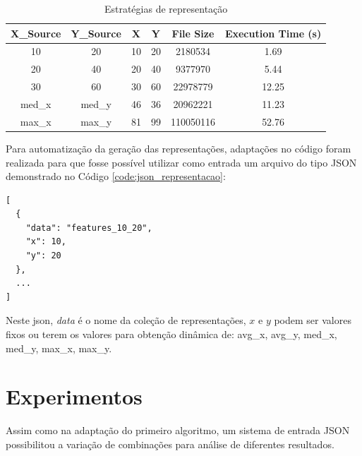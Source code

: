\documentclass[9pt,twocolumn]{article}
\begin{document}
\begin{table}[t]
  \centering
  \begin{tabular}{|c|c|c|c|c|c|}
  \hline
  \textbf{X\_Source} & \textbf{Y\_Source} & \textbf{X} & \textbf{Y} & \textbf{File Size} & \textbf{Execution Time (s)} \\ \hline
  10                 & 20                 & 10         & 20         & 2180534            & 1.69                    \\ \hline
  20                 & 40                 & 20         & 40         & 9377970            & 5.44                    \\ \hline
  30                 & 60                 & 30         & 60         & 22978779           & 12.25                   \\ \hline
  med\_x             & med\_y             & 46         & 36         & 20962221           & 11.23                   \\ \hline
  max\_x             & max\_y             & 81         & 99         & 110050116          & 52.76                   \\ \hline
  \end{tabular}
  \caption{Estratégias de representação}
  \label{tab:estrategias_representacao}
\end{table}

Para automatização da geração das representações, adaptações no código foram realizada para que fosse possível utilizar como entrada um arquivo do tipo JSON demonstrado no Código \ref{code:json_representacao}:

\begin{lstlisting}[caption={JSON para representações},captionpos=b,frame=single,label={code:json_representacao}]
[
  {
    "data": "features_10_20",
    "x": 10,
    "y": 20
  },
  ...
]
\end{lstlisting}

Neste json, \textit{data} é o nome da coleção de representações, $x$ e $y$ podem ser valores fixos ou terem os valores para obtenção dinâmica de: avg\_x, avg\_y, med\_x, med\_y, max\_x, max\_y.

\section{Experimentos}

Assim como na adaptação do primeiro algoritmo, um sistema de entrada JSON possibilitou a variação de combinações para análise de diferentes resultados.
\end{document}

